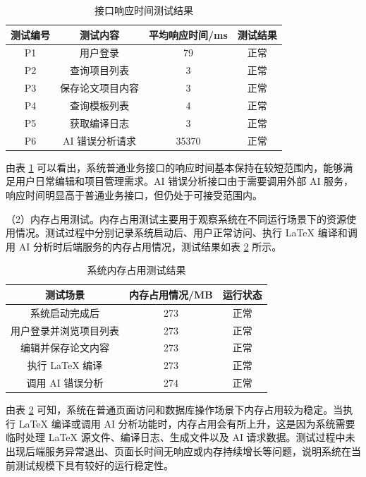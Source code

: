 \documentclass{xduugthesis}
\begin{document}
\begin{table}[!ht]
    \centering
    \caption{接口响应时间测试结果}
    \label{tab:response-time-test}
    \begin{tabular}{|c|c|c|c|}
        \hline
        测试编号 & 测试内容 & 平均响应时间/ms & 测试结果 \\
        \hline
        P1 & 用户登录 & 79 & 正常 \\
        \hline
        P2 & 查询项目列表 & 3 & 正常 \\
        \hline
        P3 & 保存论文项目内容 & 3 & 正常 \\
        \hline
        P4 & 查询模板列表 & 4 & 正常 \\
        \hline
        P5 & 获取编译日志 & 3 & 正常 \\
        \hline
        P6 & AI 错误分析请求 & 35370 & 正常 \\
        \hline
    \end{tabular}
\end{table}

由表 \ref{tab:response-time-test} 可以看出，系统普通业务接口的响应时间基本保持在较短范围内，能够满足用户日常编辑和项目管理需求。AI 错误分析接口由于需要调用外部 AI 服务，响应时间明显高于普通业务接口，但仍处于可接受范围内。

（2）内存占用测试。内存占用测试主要用于观察系统在不同运行场景下的资源使用情况。测试过程中分别记录系统启动后、用户正常访问、执行 LaTeX 编译和调用 AI 分析时后端服务的内存占用情况，测试结果如表 \ref{tab:memory-test} 所示。

\begin{table}[!ht]
    \centering
    \caption{系统内存占用测试结果}
    \label{tab:memory-test}
    \begin{tabular}{|c|c|c|}
        \hline
        测试场景 & 内存占用情况/MB & 运行状态 \\
        \hline
        系统启动完成后 & 273 & 正常 \\
        \hline
        用户登录并浏览项目列表 & 273 & 正常 \\
        \hline
        编辑并保存论文内容 & 273 & 正常 \\
        \hline
        执行 LaTeX 编译 & 273 & 正常 \\
        \hline
        调用 AI 错误分析 & 274 & 正常 \\
        \hline
    \end{tabular}
\end{table}

由表 \ref{tab:memory-test} 可知，系统在普通页面访问和数据库操作场景下内存占用较为稳定。当执行 LaTeX 编译或调用 AI 分析功能时，内存占用会有所上升，这是因为系统需要临时处理 LaTeX 源文件、编译日志、生成文件以及 AI 请求数据。测试过程中未出现后端服务异常退出、页面长时间无响应或内存持续增长等问题，说明系统在当前测试规模下具有较好的运行稳定性。
\end{document}

